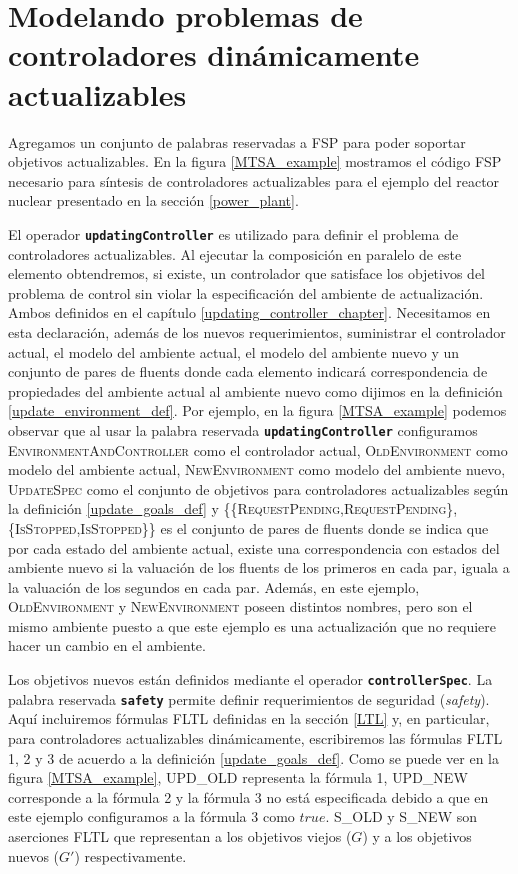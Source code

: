 \section{Modelando problemas de controladores dinámicamente actualizables}

Agregamos un conjunto de palabras reservadas a FSP para poder soportar objetivos actualizables. En la figura
\ref{MTSA_example} mostramos el código FSP necesario para síntesis de controladores actualizables para el ejemplo del reactor nuclear
presentado en la sección \ref{power_plant}.

El operador \texttt{\textbf{updatingController}} es utilizado para definir el problema de controladores
actualizables. Al ejecutar la composición en paralelo de este elemento obtendremos, si existe, un controlador que satisface los
objetivos del problema de control sin violar la especificación del ambiente de actualización. Ambos definidos en el
capítulo \ref{updating_controller_chapter}. Necesitamos en esta declaración, además de los nuevos requerimientos, suministrar
el controlador actual, el modelo del ambiente actual, el modelo del ambiente nuevo y un conjunto de pares de fluents
donde cada elemento indicará correspondencia de propiedades del ambiente actual al ambiente nuevo como dijimos en la
definición \ref{update_environment_def}. Por ejemplo, en la figura \ref{MTSA_example} podemos observar que al usar la
palabra reservada \texttt{\textbf{updatingController}} configuramos \textsc{EnvironmentAndController} como el
controlador actual, \textsc{OldEnvironment} como modelo del ambiente actual, \textsc{NewEnvironment} como modelo del
ambiente nuevo, \textsc{UpdateSpec} como el conjunto de objetivos para controladores actualizables según la
definición \ref{update_goals_def} y \textsc{\{\{RequestPending,RequestPending\},
\{IsStopped,IsStopped\}\}} es el conjunto de pares de fluents donde se indica que por cada estado del ambiente actual,
existe una correspondencia con estados del ambiente nuevo si la valuación de los fluents de los primeros en cada par,
iguala a la valuación de los segundos en cada par. Además, en este ejemplo, \textsc{OldEnvironment} y
\textsc{NewEnvironment} poseen distintos nombres, pero son el mismo ambiente puesto a que este ejemplo es una
actualización que no requiere hacer un cambio en el ambiente.

Los objetivos nuevos están definidos mediante el operador \texttt{\textbf{controllerSpec}}. La palabra reservada
\texttt{\textbf{safety}} permite definir requerimientos de seguridad (\emph{safety}). Aquí incluiremos fórmulas
FLTL definidas en la sección \ref{LTL} y, en particular, para controladores actualizables dinámicamente, escribiremos las
fórmulas FLTL 1, 2 y 3 de acuerdo a la definición \ref{update_goals_def}. Como se puede ver en la figura \ref{MTSA_example},
\textsc{UPD\_OLD} representa la fórmula 1, \textsc{UPD\_NEW} corresponde a la fórmula 2 y la fórmula 3 no está
especificada debido a que en este ejemplo configuramos a la fórmula 3 como $true$. \textsc{S\_OLD} y \textsc{S\_NEW} son
aserciones FLTL que representan a los objetivos viejos ($G$) y a los objetivos nuevos ($G'$) respectivamente.


